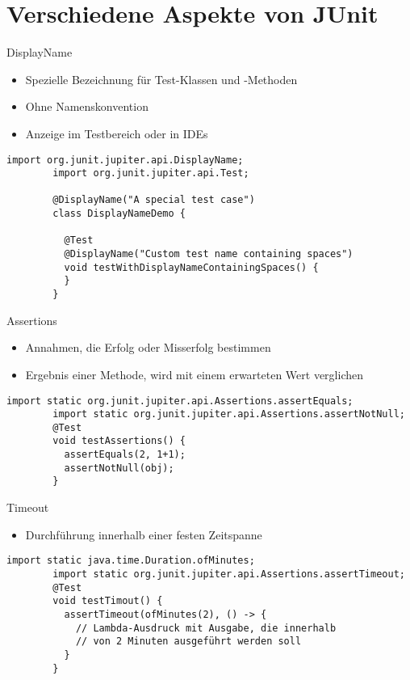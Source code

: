 \documentclass[utf8,t,aspectratio=169]{beamer}
\begin{document}
  \section{Verschiedene Aspekte von JUnit}
    \begin{frame}[fragile]{DisplayName}
      \begin{itemize}
        \item Spezielle Bezeichnung für Test-Klassen und -Methoden
        \item Ohne Namenskonvention
        \item Anzeige im Testbereich oder in IDEs
      \end{itemize}
      \begin{lstlisting}[gobble=8]
        import org.junit.jupiter.api.DisplayName;
        import org.junit.jupiter.api.Test;

        @DisplayName("A special test case")
        class DisplayNameDemo {

          @Test
          @DisplayName("Custom test name containing spaces")
          void testWithDisplayNameContainingSpaces() {
          }
        }
      \end{lstlisting}
    \end{frame}
    \begin{frame}[fragile]{Assertions}
      \begin{itemize}
        \item Annahmen, die Erfolg oder Misserfolg bestimmen
          \item Ergebnis einer Methode, wird mit einem erwarteten Wert
            verglichen
      \end{itemize}
      \begin{lstlisting}[gobble=8]
        import static org.junit.jupiter.api.Assertions.assertEquals;
        import static org.junit.jupiter.api.Assertions.assertNotNull;
        @Test
        void testAssertions() {
          assertEquals(2, 1+1);
          assertNotNull(obj);
        }
      \end{lstlisting}
    \end{frame}
    \begin{frame}[fragile]{Timeout}
      \begin{itemize}
        \item Durchführung innerhalb einer festen Zeitspanne
      \end{itemize}
      \begin{lstlisting}[gobble=8]
        import static java.time.Duration.ofMinutes;
        import static org.junit.jupiter.api.Assertions.assertTimeout;
        @Test
        void testTimout() {
          assertTimeout(ofMinutes(2), () -> {
            // Lambda-Ausdruck mit Ausgabe, die innerhalb
            // von 2 Minuten ausgeführt werden soll
          }
        }
      \end{lstlisting}
    \end{frame}
\end{document}
